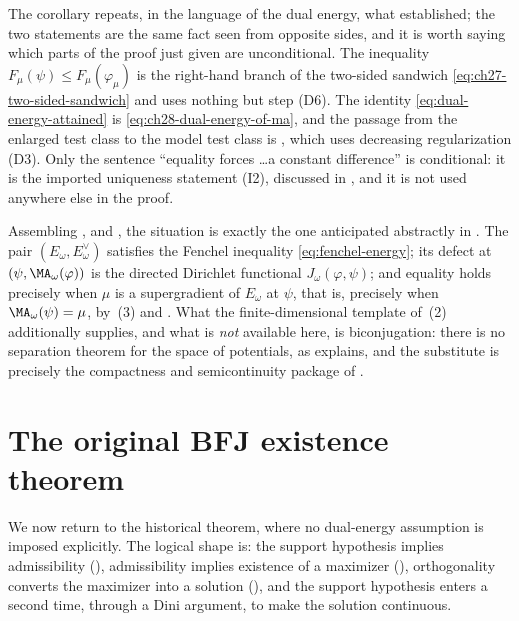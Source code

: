 The corollary repeats, in the language of the dual energy, what
 established; the two statements are the
same fact seen from opposite sides, and it is worth saying which parts of
the proof just given are unconditional.  The inequality
\(F_\mu(\psi)\leq F_\mu(\varphi_\mu)\) is the right-hand branch of the
two-sided sandwich \eqref{eq:ch27-two-sided-sandwich} and uses nothing but
step \textup{(D6)}.  The identity \eqref{eq:dual-energy-attained} is
\eqref{eq:ch28-dual-energy-of-ma}, and the passage from the enlarged test
class to the model test class is , which uses
decreasing regularization \textup{(D3)}.  Only the sentence
``equality forces \dots a constant difference'' is conditional: it is the
imported uniqueness statement \textup{(I2)}, discussed in
, and it is not used anywhere else in the proof.

\begin{remark}
\label{rem:ch28-fenchel-picture}
Assembling ,
 and
, the situation is
exactly the one anticipated abstractly in .
The pair \((E_\omega,E^\vee_\omega)\) satisfies the Fenchel inequality
\eqref{eq:fenchel-energy}; its defect at \((\psi,\MA_\omega(\varphi))\) is
the directed Dirichlet functional \(J_\omega(\varphi,\psi)\); and equality
holds precisely when \(\mu\) is a supergradient of \(E_\omega\) at
\(\psi\), that is, precisely when \(\MA_\omega(\psi)=\mu\), by
\,(3) and
.  What the finite-dimensional
template of \,(2) additionally supplies,
and what is \emph{not} available here, is biconjugation: there is no
separation theorem for the space of potentials, as
 explains, and the substitute is
precisely the compactness and semicontinuity package of
.
\end{remark}

\section{The original BFJ existence theorem}
\label{sec:ch28-bfj-theorem}

We now return to the historical theorem, where no dual-energy assumption is
imposed explicitly.  The logical shape is: the support hypothesis implies
admissibility (), admissibility implies
existence of a maximizer (),
orthogonality converts the maximizer into a solution
(), and the support hypothesis
enters a second time, through a Dini argument, to make the solution
continuous.

